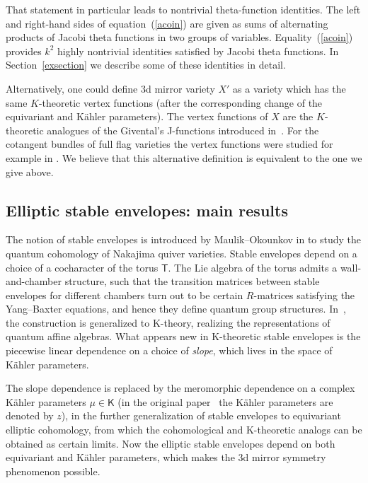 \documentclass[pdftex]{sigma}
\newcommand{\bK}{\mathsf{K}}
\newcommand{\bT}{\mathsf{T}}
\numberwithin{equation}{section}
\begin{document}
That statement in particular leads to nontrivial theta-function identities. The left and right-hand sides of equation~(\ref{acoin}) are given as sums of alternating products of Jacobi theta functions in two groups of variables. Equality~(\ref{acoin}) provides $k^2$ highly nontrivial identities satisfied by Jacobi theta functions. In Section~\ref{exsection} we describe some of these identities in detail.

Alternatively, one could define 3d mirror variety $X'$ as a variety which has the same $K$-theoretic vertex functions (after the corresponding change of the equivariant and K\"ahler para\-me\-ters). The vertex functions of $X$ are the $K$-theoretic analogues of the Givental's J-functions introduced in~\cite{pcmilec}. For the cotangent bundles of full flag varieties the vertex functions were studied for example in \cite{Korot1,Kor2,Push2}. We believe that this alternative definition is equivalent to the one we give above.

\subsection{Elliptic stable envelopes: main results}

The notion of stable envelopes is introduced by Maulik--Okounkov in \cite{MO} to study the quantum cohomology of Nakajima quiver varieties. Stable envelopes depend on a choice of a cocharacter of the torus $\bT$. The Lie algebra of the torus admits a wall-and-chamber structure, such that the transition matrices between stable envelopes for different chambers turn out to be certain $R$-matrices satisfying the Yang--Baxter equations, and hence they define quantum group structures. In~\cite{pcmilec, OS}, the construction is generalized to K-theory, realizing the representations of quantum affine algebras. What appears new in K-theoretic stable envelopes is the piecewise linear dependence on a choice of \emph{slope}, which lives in the space of K\"ahler parameters.

The slope dependence is replaced by the meromorphic dependence on a complex K\"ahler parameters $\mu \in \bK$ (in the original paper~\cite{AOelliptic} the K\"ahler parameters are denoted by $z$), in the further generalization of stable envelopes to equivariant elliptic cohomology, from which the cohomological and K-theoretic analogs can be obtained as certain limits. Now the elliptic stable envelopes depend on both equivariant and K\"ahler parameters, which makes the 3d mirror symmetry phenomenon possible.
\end{document}
